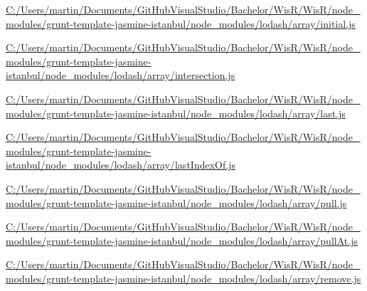 \begin{DoxyCompactItemize}
\item 
\hyperlink{_c_1_2_users_2martin_2_documents_2_git_hub_visual_studio_2_bachelor_2_wis_r_2_wis_r_2node_moduleab7a9eaec349afc15135ffb04e5a6745}{C\+:/\+Users/martin/\+Documents/\+Git\+Hub\+Visual\+Studio/\+Bachelor/\+Wis\+R/\+Wis\+R/node\+\_\+modules/grunt-\/template-\/jasmine-\/istanbul/node\+\_\+modules/lodash/array/initial.\+js}
\item 
\hyperlink{_c_1_2_users_2martin_2_documents_2_git_hub_visual_studio_2_bachelor_2_wis_r_2_wis_r_2node_modulecb1784e1468311bf1ae37251b4bbee7c}{C\+:/\+Users/martin/\+Documents/\+Git\+Hub\+Visual\+Studio/\+Bachelor/\+Wis\+R/\+Wis\+R/node\+\_\+modules/grunt-\/template-\/jasmine-\/istanbul/node\+\_\+modules/lodash/array/intersection.\+js}
\item 
\hyperlink{_c_1_2_users_2martin_2_documents_2_git_hub_visual_studio_2_bachelor_2_wis_r_2_wis_r_2node_moduledafc5058d1c073a9a84f88e492fe5be8}{C\+:/\+Users/martin/\+Documents/\+Git\+Hub\+Visual\+Studio/\+Bachelor/\+Wis\+R/\+Wis\+R/node\+\_\+modules/grunt-\/template-\/jasmine-\/istanbul/node\+\_\+modules/lodash/array/last.\+js}
\item 
\hyperlink{_c_1_2_users_2martin_2_documents_2_git_hub_visual_studio_2_bachelor_2_wis_r_2_wis_r_2node_moduleb7bb7901f2d8b4538e544dd9ed2692b7}{C\+:/\+Users/martin/\+Documents/\+Git\+Hub\+Visual\+Studio/\+Bachelor/\+Wis\+R/\+Wis\+R/node\+\_\+modules/grunt-\/template-\/jasmine-\/istanbul/node\+\_\+modules/lodash/array/last\+Index\+Of.\+js}
\item 
\hyperlink{_c_1_2_users_2martin_2_documents_2_git_hub_visual_studio_2_bachelor_2_wis_r_2_wis_r_2node_module0b8ae4ede47f44420915879b442e9f6c}{C\+:/\+Users/martin/\+Documents/\+Git\+Hub\+Visual\+Studio/\+Bachelor/\+Wis\+R/\+Wis\+R/node\+\_\+modules/grunt-\/template-\/jasmine-\/istanbul/node\+\_\+modules/lodash/array/pull.\+js}
\item 
\hyperlink{_c_1_2_users_2martin_2_documents_2_git_hub_visual_studio_2_bachelor_2_wis_r_2_wis_r_2node_moduled05df6815040473064b9ee6dd8785401}{C\+:/\+Users/martin/\+Documents/\+Git\+Hub\+Visual\+Studio/\+Bachelor/\+Wis\+R/\+Wis\+R/node\+\_\+modules/grunt-\/template-\/jasmine-\/istanbul/node\+\_\+modules/lodash/array/pull\+At.\+js}
\item 
\hyperlink{_c_1_2_users_2martin_2_documents_2_git_hub_visual_studio_2_bachelor_2_wis_r_2_wis_r_2node_module9ab9d70b7baf8861a4af378bca096a97}{C\+:/\+Users/martin/\+Documents/\+Git\+Hub\+Visual\+Studio/\+Bachelor/\+Wis\+R/\+Wis\+R/node\+\_\+modules/grunt-\/template-\/jasmine-\/istanbul/node\+\_\+modules/lodash/array/remove.\+js}

\end{DoxyCompactItemize}

